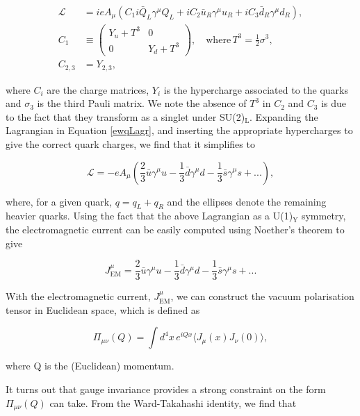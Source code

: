 \documentclass{article}
\numberwithin{equation}{section} %
\begin{document}
\begin{equation}
\begin{split}
\mathcal{L} &= ieA_\mu (C_1i\bar{Q}_L\gamma^\mu Q_L + iC_2\bar{u}_R\gamma^\mu u_R + iC_3\bar{d}_R\gamma^\mu d_R),\\
C_1&\equiv \begin{pmatrix} Y_u+T^3 & 0 \\ 0 & Y_d+T^3
\end{pmatrix}, \quad \mathrm{where \,} T^3=\frac{1}{2}\sigma^3,\\
C_{2,3}&=Y_{2,3},
\end{split}
\label{emLagr}
\end{equation}

\noindent where $C_i$ are the charge matrices, $Y_i$ is the hypercharge associated to the quarks and $\sigma_3$ is the third Pauli matrix. We note the absence of $T^3$ in $C_2$ and $C_3$ is due to the fact that they transform as a singlet under SU(2)$_\mathrm{L}$. Expanding the Lagrangian in Equation \ref{ewqLagr}, and inserting the appropriate hypercharges to give the correct quark charges, we find that it simplifies to

\begin{equation}
\mathcal{L}=-eA_\mu\left(\frac{2}{3}\bar{u}\gamma^\mu u -\frac{1}{3}\bar{d}\gamma^\mu d -\frac{1}{3}\bar{s}\gamma^\mu s + ...\right),
\end{equation}

\noindent where, for a given quark, $q=q_L + q_R$ and the ellipses denote the remaining heavier quarks. Using the fact that the above Lagrangian as a U(1)$_\mathrm{Y}$ symmetry, the electromagnetic current can be easily computed using Noether's theorem to give

\begin{equation}
J_\mathrm{EM}^\mu = \frac{2}{3}\bar{u}\gamma^\mu u -\frac{1}{3}\bar{d}\gamma^\mu d -\frac{1}{3}\bar{s}\gamma^\mu s + ...
\end{equation}

With the electromagnetic current, $J_\mathrm{EM}^\mu$, we can construct the vacuum polarisation tensor in Euclidean space, which is defined as

\begin{equation}
\Pi_{\mu\nu}(Q) = \int d^4x \, e^{iQx} \langle J_\mu(x) J_\nu(0)\rangle,
\end{equation}

\noindent where Q is the (Euclidean) momentum. 

It turns out that gauge invariance provides a strong constraint on the form $\Pi_{\mu\nu}(Q)$ can take. From the Ward-Takahashi identity\cite{zee}, we find that 
\end{document}
